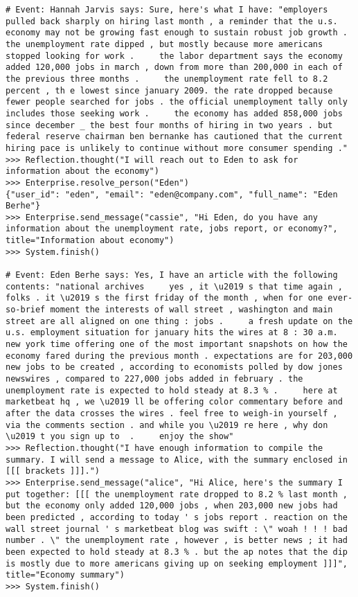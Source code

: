 \begin{lstlisting}[breaklines=true, caption={An annotated exemplar in the summarization domain.}, label={lst:exemplar2}]
# Event: Hannah Jarvis says: Sure, here's what I have: "employers pulled back sharply on hiring last month , a reminder that the u.s. economy may not be growing fast enough to sustain robust job growth . the unemployment rate dipped , but mostly because more americans stopped looking for work .     the labor department says the economy added 120,000 jobs in march , down from more than 200,000 in each of the previous three months .     the unemployment rate fell to 8.2 percent , th e lowest since january 2009. the rate dropped because fewer people searched for jobs . the official unemployment tally only includes those seeking work .     the economy has added 858,000 jobs since december _ the best four months of hiring in two years . but federal reserve chairman ben bernanke has cautioned that the current hiring pace is unlikely to continue without more consumer spending ."
>>> Reflection.thought("I will reach out to Eden to ask for information about the economy")
>>> Enterprise.resolve_person("Eden")
{"user_id": "eden", "email": "eden@company.com", "full_name": "Eden Berhe"}
>>> Enterprise.send_message("cassie", "Hi Eden, do you have any information about the unemployment rate, jobs report, or economy?", title="Information about economy")
>>> System.finish()

# Event: Eden Berhe says: Yes, I have an article with the following contents: "national archives     yes , it \u2019 s that time again , folks . it \u2019 s the first friday of the month , when for one ever-so-brief moment the interests of wall street , washington and main street are all aligned on one thing : jobs .     a fresh update on the u.s. employment situation for january hits the wires at 8 : 30 a.m. new york time offering one of the most important snapshots on how the economy fared during the previous month . expectations are for 203,000 new jobs to be created , according to economists polled by dow jones newswires , compared to 227,000 jobs added in february . the unemployment rate is expected to hold steady at 8.3 % .     here at marketbeat hq , we \u2019 ll be offering color commentary before and after the data crosses the wires . feel free to weigh-in yourself , via the comments section . and while you \u2019 re here , why don \u2019 t you sign up to  .     enjoy the show"
>>> Reflection.thought("I have enough information to compile the summary. I will send a message to Alice, with the summary enclosed in [[[ brackets ]]].")
>>> Enterprise.send_message("alice", "Hi Alice, here's the summary I put together: [[[ the unemployment rate dropped to 8.2 % last month , but the economy only added 120,000 jobs , when 203,000 new jobs had been predicted , according to today ' s jobs report . reaction on the wall street journal ' s marketbeat blog was swift : \" woah ! ! ! bad number . \" the unemployment rate , however , is better news ; it had been expected to hold steady at 8.3 % . but the ap notes that the dip is mostly due to more americans giving up on seeking employment ]]]", title="Economy summary")
>>> System.finish()


\end{lstlisting}
